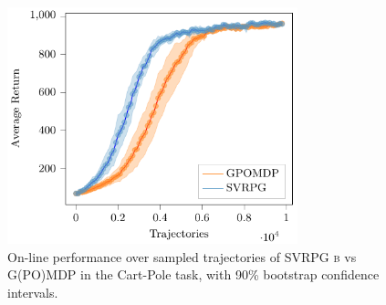 \begin{figure}[h]
	\begin{minipage}[h]{1\textwidth}
		\centering
		\includegraphics[width=0.75\textwidth]{Images/Experiments/cart_pole_GPOMDP_vs_SVRPG_B.pdf}
		\vspace{-0.1in}
		\caption{On-line performance over sampled trajectories of \acs{SVRPG} \textsc{b} vs G(PO)MDP in the Cart-Pole task, with 90\% bootstrap confidence intervals.}
		\label{fig:cartpole1}
	\end{minipage}
	\vspace{-0.15in}
\end{figure}


